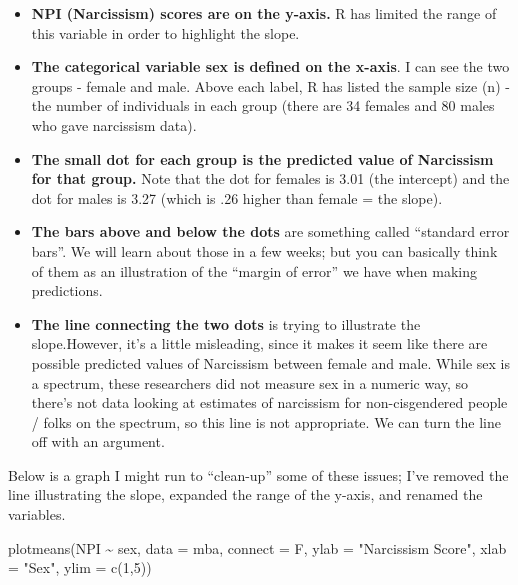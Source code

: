 \documentclass[
  letterpaper,
  DIV=11,
  numbers=noendperiod,
  oneside]{scrreprt}
\newenvironment{Shaded}{\begin{snugshade}}{\end{snugshade}}
\newcommand{\AttributeTok}[1]{\textcolor[rgb]{0.40,0.45,0.13}{#1}}
\newcommand{\DecValTok}[1]{\textcolor[rgb]{0.68,0.00,0.00}{#1}}
\newcommand{\FunctionTok}[1]{\textcolor[rgb]{0.28,0.35,0.67}{#1}}
\newcommand{\NormalTok}[1]{\textcolor[rgb]{0.00,0.23,0.31}{#1}}
\newcommand{\SpecialCharTok}[1]{\textcolor[rgb]{0.37,0.37,0.37}{#1}}
\newcommand{\StringTok}[1]{\textcolor[rgb]{0.13,0.47,0.30}{#1}}
\begin{document}
\begin{itemize}
\item
  \textbf{NPI (Narcissism) scores are on the y-axis.} R has limited the
  range of this variable in order to highlight the slope.~
\item
  \textbf{The categorical variable sex is defined on the x-axis}. I can
  see the two groups - female and male. Above each label, R has listed
  the sample size (n) - the number of individuals in each group (there
  are 34 females and 80 males who gave narcissism data).
\item
  \textbf{The small dot for each group is the predicted value of
  Narcissism for that group.} Note that the dot for females is 3.01 (the
  intercept) and the dot for males is 3.27 (which is .26 higher than
  female = the slope).
\item
  \textbf{The bars above and below the dots} are something called
  ``standard error bars''. We will learn about those in a few weeks; but
  you can basically think of them as an illustration of the ``margin of
  error'' we have when making predictions.
\item
  \textbf{The line connecting the two dots} is trying to illustrate the
  slope.However, it's a little misleading, since it makes it seem like
  there are possible predicted values of Narcissism between female and
  male. While sex is a spectrum, these researchers did not measure sex
  in a numeric way, so there's not data looking at estimates of
  narcissism for non-cisgendered people / folks on the spectrum, so this
  line is not appropriate. We can turn the line off with an argument.
\end{itemize}

Below is a graph I might run to ``clean-up'' some of these issues; I've
removed the line illustrating the slope, expanded the range of the
y-axis, and renamed the variables.~

\begin{Shaded}
\begin{Highlighting}[]
\FunctionTok{plotmeans}\NormalTok{(NPI }\SpecialCharTok{\textasciitilde{}}\NormalTok{ sex, }\AttributeTok{data =}\NormalTok{ mba, }\AttributeTok{connect =}\NormalTok{ F, }\AttributeTok{ylab =} \StringTok{"Narcissism Score"}\NormalTok{, }\AttributeTok{xlab =} \StringTok{"Sex"}\NormalTok{,}
          \AttributeTok{ylim =} \FunctionTok{c}\NormalTok{(}\DecValTok{1}\NormalTok{,}\DecValTok{5}\NormalTok{))}
\end{Highlighting}
\end{Shaded}
\end{document}
